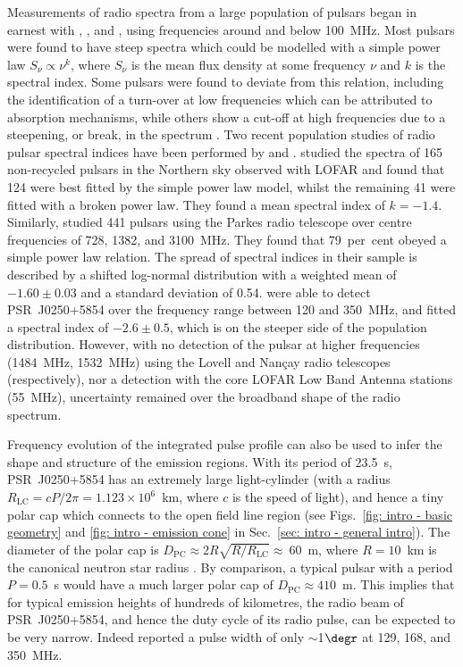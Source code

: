 Measurements of radio spectra from a large population of pulsars began in earnest with \citet{Sxxx1973}, \citet{MMxx1980}, and \citet{IKMS1981}, using frequencies around and below 100~MHz. Most pulsars were found to have steep spectra which could be modelled with a simple power law $S_\nu \propto \nu^k$, where $S_\nu$ is the mean flux density at some frequency $\nu$ and $k$ is the spectral index. Some pulsars were found to deviate from this relation, including the identification of a turn-over at low frequencies which can be attributed to absorption mechanisms, while others show a cut-off at high frequencies due to a steepening, or break, in the spectrum \citep{Sxxx1973}. Two recent population studies of radio pulsar spectral indices have been performed by \citet{BKK+2016} and \citet{JSK+2018}. \citet{BKK+2016} studied the spectra of 165 non-recycled pulsars in the Northern sky observed with LOFAR and found that 124 were best fitted by the simple power law model, whilst the remaining 41 were fitted with a broken power law. They found a mean spectral index of $k = -1.4$. Similarly, \citet{JSK+2018} studied 441 pulsars using the Parkes radio telescope over centre frequencies of 728, 1382, and 3100~MHz. They found that 79~per~cent obeyed a simple power law relation. The spread of spectral indices in their sample is described by a shifted log-normal distribution with a weighted mean of $-1.60\pm0.03$ and a standard deviation of 0.54. \citet{TBC+2018} were able to detect PSR~J0250+5854 over the frequency range between 120 and 350~MHz, and fitted a spectral index of $-2.6\pm0.5$, which is on the steeper side of the population distribution. However, with no detection of the pulsar at higher frequencies (1484~MHz, 1532~MHz) using the Lovell and Nan\c{c}ay radio telescopes (respectively), nor a detection with the core LOFAR Low Band Antenna stations (55~MHz), uncertainty remained over the broadband shape of the radio spectrum. 

Frequency evolution of the integrated pulse profile can also be used to infer the shape and structure of the emission regions. With its period of 23.5~s, PSR~J0250+5854 has an extremely large light-cylinder (with a radius $R_\mathrm{LC} = cP/2\pi =  1.123\times10^{6}$~km, where $c$ is the speed of light), and hence a tiny polar cap which connects to the open field line region (see Figs.~\ref{fig: intro - basic geometry} and \ref{fig: intro - emission cone} in Sec.~\ref{sec: intro - general intro}). The diameter of the polar cap is $D_\mathrm{PC} \approx 2R\sqrt{R/R_\mathrm{LC}} \approx~60$~m, where $R = 10$~km is the canonical neutron star radius \citep[e.g.][]{Sxxx1971}. By comparison, a typical pulsar with a period $P = 0.5$~s would have a much larger polar cap of $D_\mathrm{PC} \approx 410$~m. This implies that for typical emission heights of hundreds of kilometres, the radio beam of PSR~J0250+5854, and hence the duty cycle of its radio pulse, can be expected to be very narrow. Indeed \citet{TBC+2018} reported a pulse width of only $\sim$1$\degr$ at 129, 168, and 350~MHz. 

